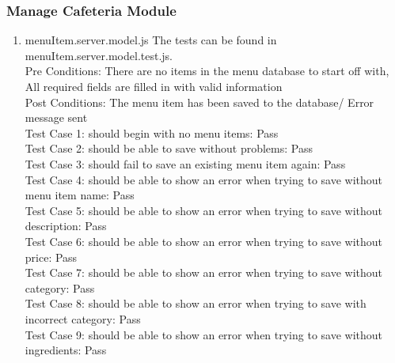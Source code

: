 \documentclass[a4paper,12pt]{report}
\begin{document}
  \subsubsection{Manage Cafeteria Module  }
 \begin{enumerate}
\item menuItem.server.model.js
The tests can be found in menuItem.server.model.test.js.\\
Pre Conditions: There are no items in the menu database to start off with, All required fields are filled in with valid information\\
Post Conditions: The menu item has been saved to the database/ Error message sent\\
Test Case 1: should begin with no menu items: Pass\\
Test Case 2: should be able to save without problems: Pass\\
Test Case 3: should fail to save an existing menu item again: Pass\\
Test Case 4: should be able to show an error when trying to save without menu item name: Pass\\
Test Case 5: should be able to show an error when trying to save without description: Pass\\
Test Case 6: should be able to show an error when trying to save without price: Pass\\
Test Case 7: should be able to show an error when trying to save without category: Pass\\
Test Case 8: should be able to show an error when trying to save with incorrect category: Pass\\
Test Case 9: should be able to show an error when trying to save without ingredients: Pass\\
 \end{enumerate}
\end{document}
